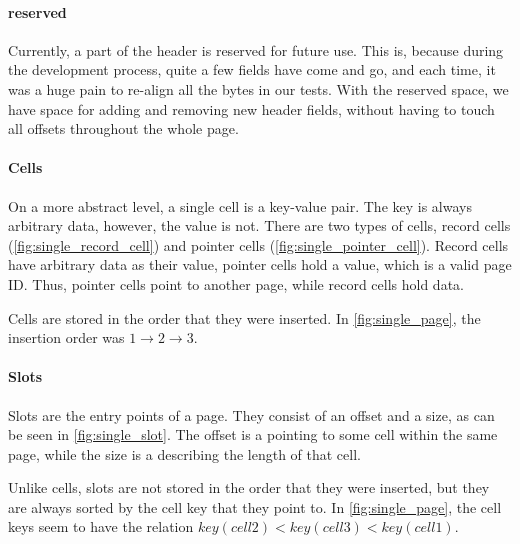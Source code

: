 \paragraph{reserved}
Currently, a part of the header is reserved for future use.
This is, because during the development process, quite a few fields have come and go, and each time, it was a huge pain to re-align all the bytes in our tests.
With the reserved space, we have space for adding and removing new header fields, without having to touch all offsets throughout the whole page.

\paragraph{Cells}
On a more abstract level, a single cell is a key-value pair.
The key is always arbitrary data, however, the value is not.
There are two types of cells, record cells (\autoref{fig:single_record_cell}) and pointer cells (\autoref{fig:single_pointer_cell}).
Record cells have arbitrary data as their value, pointer cells hold a  value, which is a valid page ID.
Thus, pointer cells point to another page, while record cells hold data.

Cells are stored in the order that they were inserted.
In \autoref{fig:single_page}, the insertion order was $1 \rightarrow 2 \rightarrow 3$.

\paragraph{Slots}
Slots are the entry points of a page.
They consist of an offset and a size, as can be seen in \autoref{fig:single_slot}.
The offset is a  pointing to some cell within the same page, while the size is a  describing the length of that cell.

Unlike cells, slots are not stored in the order that they were inserted, but they are always sorted by the cell key that they point to.
In \autoref{fig:single_page}, the cell keys seem to have the relation $key(cell 2) < key(cell 3) < key(cell 1)$.


